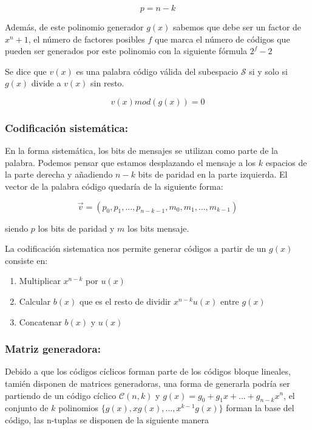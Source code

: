 \documentclass{article}
\begin{document}
\begin{equation}
    p = n - k
\end{equation}

Además, de este polinomio generador $g(x)$ sabemos que debe ser un factor de $x^n+1$, el número de factores posibles $f$ que marca el número de códigos que pueden ser generados por este polinomio con la siguiente fórmula $2^f-2$

Se dice que $v(x)$ es una palabra código válida del subespacio $\mathcal{S}$ si y solo si $g(x)$ divide a $v(x)$ sin resto.

\begin{equation}
    v(x)mod(g(x)) = 0
\end{equation}

\subsubsection{Codificación sistemática:}

En la forma sistemática, los bits de mensajes se utilizan como parte de la palabra. Podemos pensar que estamos desplazando el mensaje a los $k$ espacios de la parte derecha y añadiendo $n-k$ bits de paridad en la parte izquierda. El vector de la palabra código quedaría de la siguiente forma:

\begin{equation}
    \vec{v} = (p_0, p_1, ..., p_{n-k-1}, m_0, m_1, ..., m_{k-1})
\end{equation}

siendo $p$ los bits de paridad y $m$ los bits mensaje.

La codificación sistematica nos permite generar códigos a partir de un $g(x)$ consiste en:

\begin{enumerate}
    \item Multiplicar $x^{n-k}$ por $u(x)$
    \item Calcular $b(x)$ que es el resto de dividir $x^{n-k}u(x)$ entre $g(x)$
    \item Concatenar $b(x)$ y $u(x)$
\end{enumerate}

\subsubsection{Matriz generadora:}

Debido a que los códigos cíclicos forman parte de los códigos bloque lineales, tamién disponen de matrices generadoras, una  forma de generarla podría ser partiendo de un código cíclico $\mathcal{C}(n,k)$ y $g(x) = g_0 + g_1x + ... + g_{n-k}x^n$, el conjunto de $k$ polinomios $\{g(x), xg(x), ..., x^{k-1}g(x)\}$ forman la base del código, las n-tuplas se disponen de la siguiente manera
\end{document}
